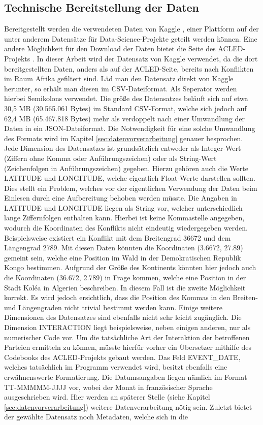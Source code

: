 \documentclass[usegeometry=true]{scrartcl}
\begin{document}
\subsection{Technische Bereitstellung der Daten}

Bereitgestellt werden die verwendeten Daten von Kaggle \cite{kaggle}, einer Plattform auf der unter anderem Datensätze für Data-Science-Projekte geteilt werden können. Eine andere Möglichkeit für den Download der Daten bietet die Seite des ACLED-Projekts \cite{acled}. In dieser Arbeit wird der Datensatz von Kaggle verwendet, da die dort bereitgestellten Daten, anders als auf der ACLED-Seite, bereits nach Konflikten im Raum Afrika gefiltert sind. Läd man den Datensatz direkt von Kaggle herunter, so erhält man diesen im CSV-Dateiformat. Als Seperator werden hierbei Semikolons verwendet. Die größe des Datensatzes beläuft sich auf etwa 30,5 MB (30.565.061 Bytes) im Standard CSV-Format, welche sich jedoch auf 62,4 MB (65.467.818 Bytes) mehr als verdoppelt nach einer Umwandlung der Daten in ein JSON-Dateiformat. Die Notwendigkeit für eine solche Umwandlung des Formats wird im Kapitel \ref{sec:datenvorverarbeitung} genauer besprochen.\\ Jede Dimension des Datensatzes ist grundsätzlich entweder als Integer-Wert (Ziffern ohne Komma oder Anführungszeichen) oder als String-Wert (Zeichenfolgen in Anführungszeichen) gegeben. Hierzu gehören auch die Werte LATITUDE und LONGITUDE, welche eigentlich Float-Werte darstellen sollten. Dies stellt ein Problem, welches vor der eigentlichen Verwendung der Daten beim Einlesen durch eine Aufbereitung behoben werden müsste. Die Angaben in LATITUDE und LONGITUDE liegen als String vor, welcher unterschiedlich lange Ziffernfolgen enthalten kann. Hierbei ist keine Kommastelle angegeben, wodurch die Koordinaten des Konflikts nicht eindeutig wiedergegeben werden. Beispielsweise existiert ein Konflikt mit dem Breitengrad 36672 und dem Längengrad 2789. Mit diesen Daten könnten die Koordinaten (3.6672, 27.89) gemeint sein, welche eine Position im Wald in der Demokratischen Republik Kongo bestimmen. Aufgrund der Größe des Kontinents könnten hier jedoch auch die Koordinaten (36.672, 2.789) in Frage kommen, welche eine Position in der Stadt Koléa in Algerien beschreiben. In diesem Fall ist die zweite Möglichkeit korrekt. Es wird jedoch ersichtlich, dass die Position des Kommas in den Breiten- und Längengraden nicht trivial bestimmt werden kann. Einige weitere Dimensionen des Datensatzes sind ebenfalls nicht sehr leicht zugänglich. Die Dimension INTERACTION liegt beispielsweise, neben einigen anderen, nur als numerischer Code vor. Um die tatsächliche Art der Interaktion der betroffenen Parteien ermitteln zu können, müsste hierfür vorher ein Übersetzer mithilfe des Codebooks des ACLED-Projekts \cite{acled-codebook} gebaut werden. Das Feld EVENT\_DATE, welches tatsächlich im Programm verwendet wird, besitzt ebenfalls eine erwähnenswerte Formatierung. Die Datumsangaben liegen nämlich im Format \glqq TT-MMMMM-JJJJ\grqq{} vor, wobei der Monat in französischer Sprache ausgeschrieben wird. Hier werden an späterer Stelle (siehe Kapitel \ref{sec:datenvorverarbeitung}) weitere Datenverarbeitung nötig sein. Zuletzt bietet der gewählte Datensatz noch Metadaten, welche sich in die 
\end{document}

